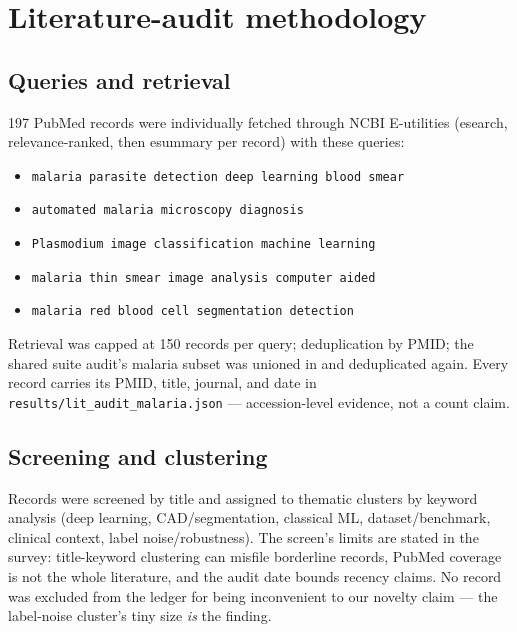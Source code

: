 
\section{Literature-audit methodology}
\subsection{Queries and retrieval}
197 PubMed records were individually fetched through NCBI E-utilities
(esearch, relevance-ranked, then esummary per record) with these queries:
\begin{itemize}
\item \texttt{malaria parasite detection deep learning blood smear}
\item \texttt{automated malaria microscopy diagnosis}
\item \texttt{Plasmodium image classification machine learning}
\item \texttt{malaria thin smear image analysis computer aided}
\item \texttt{malaria red blood cell segmentation detection}
\end{itemize}
Retrieval was capped at 150 records per query; deduplication by PMID; the
shared suite audit's malaria subset was unioned in and deduplicated again.
Every record carries its PMID, title, journal, and date in
\texttt{results/lit\_audit\_malaria.json} --- accession-level evidence, not
a count claim.
\subsection{Screening and clustering}
Records were screened by title and assigned to thematic clusters by
keyword analysis (deep learning, CAD/segmentation, classical ML,
dataset/benchmark, clinical context, label noise/robustness). The
screen's limits are stated in the survey: title-keyword clustering can
misfile borderline records, PubMed coverage is not the whole literature,
and the audit date bounds recency claims. No record was excluded from the
ledger for being inconvenient to our novelty claim --- the label-noise
cluster's tiny size \emph{is} the finding.
